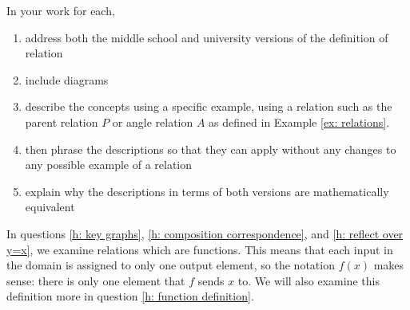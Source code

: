 \documentclass[11pt]{article}
\theoremstyle{definition}
\begin{document}
\begin{enumerate}
		In your work for each, 
		\begin{enumerate}[label=(\roman*)]
		\item address both the middle school and university versions of the definition of relation
		\item include diagrams
		\item describe the concepts using a specific example, using a relation such as the parent relation $P$ or angle relation $A$ as defined in Example \ref{ex: relations}. 
		\item then phrase the descriptions so that they can apply without any changes to any possible example of a relation
		\item explain why the descriptions in terms of both versions are mathematically equivalent
		\end{enumerate}
\end{enumerate}

In questions \ref{h: key graphs},  \ref{h: composition correspondence}, and \ref{h: reflect over y=x}, we examine relations which are functions. This means that each input in the domain is assigned to only one output element, so the notation $f(x)$ makes sense: there is only one element that $f$ sends $x$ to. We will also examine this definition more in question \ref{h: function definition}.
\end{document}
